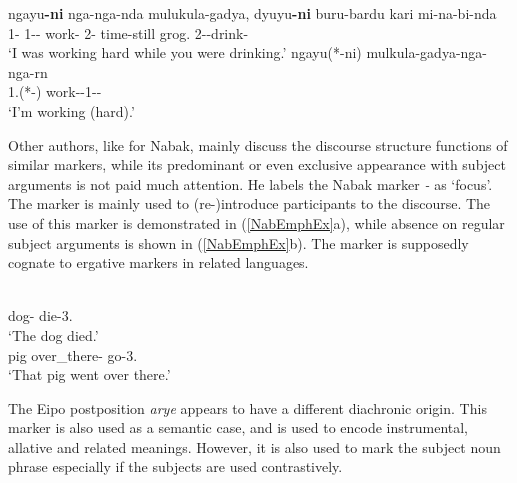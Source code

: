 \begin{exe}
\ex\label{YawEmphEx}
\begin{xlist}
\raggedright
\ex\gll ngayu\textbf{-ni} nga-nga-nda mulukula-gadya, dyuyu\textbf{-ni} buru-bardu kari mi-na-bi-nda\\
1-\erg{} 1-\aux{}-\pfv{} work-\intens{} 2-\erg{} time-still grog.\abs{} 2-\transitiv{}-drink-\pfv{}\\
\glt `I was working hard while you were drinking.'
\ex\gll ngayu(*-ni) mulkula-gadya-nga-nga-rn\\
1.\abs{}(*-\erg{}) work-\intens{}-1-\aux{}-\ipfv{}\\
\glt `I'm working (hard).'
\end{xlist}
\end{exe}

Other authors, like \citet{Fabian:1998} for Nabak, mainly discuss the discourse structure functions of similar markers, while its predominant or even exclusive appearance with subject arguments is not paid much attention.
He labels the Nabak marker \emph{-} as `focus'.
The marker is mainly used to (re-)introduce participants to the discourse. 
The use of this marker is demonstrated in (\ref{NabEmphEx}a), while absence on regular subject arguments is shown in (\ref{NabEmphEx}b).
The marker is supposedly cognate to ergative  markers in related languages.

\begin{exe}\ex\label{NabEmphEx}
\begin{xlist}
\ex\gll{} \\
dog-\foc{} die-3\sg{}.\pstrem{}\\
\glt `The dog died.'
\ex\gll {}   \\
pig \dem{} over\_there-\loc{} go-3\sg{}.\pstrem{}\\
\glt `That pig went over there.'
\end{xlist}
\end{exe}


The Eipo postposition \emph{arye} appears to have a different diachronic origin. 
This marker is also used as a semantic case, and is used to encode instrumental, allative and related meanings. 
However, it is also used to mark the subject noun phrase especially if the subjects are used contrastively. 

